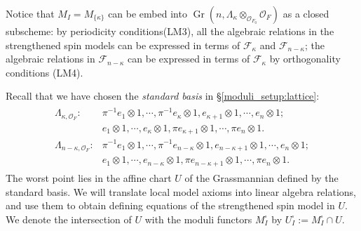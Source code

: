 \documentclass[pdflatex,sn-mathphys-num]{sn-jnl}%
\theoremstyle{thmstyleone}%
\theoremstyle{thmstyletwo}%
\numberwithin{equation}{subsection}
\theoremstyle{thmstylethree}%
\newcommand{\CF}{\ensuremath{\mathcal{F}}\xspace}
\newcommand{\CO}{\ensuremath{\mathcal{O}}\xspace}
\DeclareMathOperator{\Gr}{Gr}
\begin{document}
Notice that $M_I=M_{\{\kappa\}}$ can be embed into $\Gr(n,\Lambda_\kappa\otimes_{\CO_{F_0}}\CO_F)$ as a closed subscheme: by periodicity conditions({\selectfont LM3}), all the algebraic relations in the strengthened spin models can be expressed in terms of $\CF_{\kappa}$ and $\CF_{n-\kappa}$;
the algebraic relations in $\CF_{n-\kappa}$ can be expressed in terms of $\CF_\kappa$ by orthogonality conditions ({\selectfont LM4}).
		
Recall that we have chosen the \emph{standard basis} in \S \ref{moduli_setup:lattice}:
\begin{align}
\begin{split}\label{equ_chart:standard-basis}
	\Lambda_{\kappa,\CO_F}:  &
	\pi^{-1}e_1\otimes 1,\cdots,\pi^{-1}e_{\kappa}\otimes 1,e_{\kappa+1}\otimes 1,\cdots ,e_n\otimes 1;\\ 
	& e_1\otimes 1,\cdots,e_{\kappa}\otimes 1,\pi e_{\kappa+1}\otimes 1,\cdots,\pi e_n\otimes 1.\\
	\Lambda_{n-\kappa,\CO_F}:&
	\pi^{-1}e_1\otimes 1,\cdots,\pi^{-1}e_{n-\kappa}\otimes 1,e_{n-\kappa+1}\otimes 1,\cdots , e_n\otimes 1;\\
    &e_1\otimes 1,\cdots,e_{n-\kappa}\otimes 1,\pi e_{n-\kappa+1}\otimes 1,\cdots,\pi e_n\otimes 1.
\end{split}
\end{align}
The worst point lies in the affine chart $U$ of the Grassmannian defined by the standard basis. 
We will translate local model axioms into linear algebra relations, and use them to obtain defining equations of the strengthened spin model in $U$.
We denote the intersection of $U$ with the moduli functors $M_I^\square$ by $U_I^\square:=M_I^\square\cap U$.
		
\end{document}
